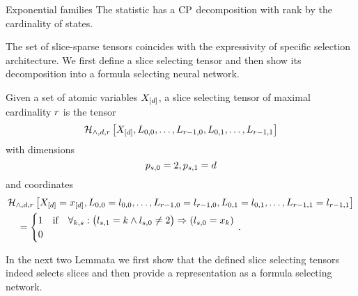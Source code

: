 \begin{example}{Exponential families}
    \label{exa:expFamCP}
    The statistic has a $\mathrm{CP}$ decomposition with rank by the cardinality of states.
\end{example}


%








The set of slice-sparse tensors coincides with the expressivity of specific selection architecture.
We first define a slice selecting tensor and then show its decomposition into a formula selecting neural network.

\begin{definition}
    Given a set of atomic variables $X_{[d]}$, a slice selecting tensor of maximal cardinality $r$ is the tensor
    \[ \mathcal{H}_{\land,d,r}\left[X_{[d]},L_{0,0},\ldots,L_{r-1,0},L_{0,1},\ldots,L_{r-1,1}\right] \]
    with dimensions
    \[ p_{s,0} = 2, p_{s,1} = d \]
    and coordinates
    \begin{align*}
        & \mathcal{H}_{\land,d,r}\left[X_{[d]}=x_{[d]},L_{0,0}=l_{0,0},\ldots,L_{r-1,0}=l_{r-1,0},L_{0,1}=l_{0,1},\ldots,L_{r-1,1}=l_{r-1,1}\right] \\
        & \quad = \begin{cases}
                      1 & \text{if} \quad
                      \forall_{k,s} : \big(  l_{s,1} = k \land l_{s,0} \neq 2 \big) \Rightarrow  (l_{s,0} = x_{k})  \\
                      0
        \end{cases} \, .
    \end{align*}
\end{definition}

In the next two Lemmata we first show that the defined slice selecting tensors indeed selects slices and then provide a representation as a formula selecting network.

